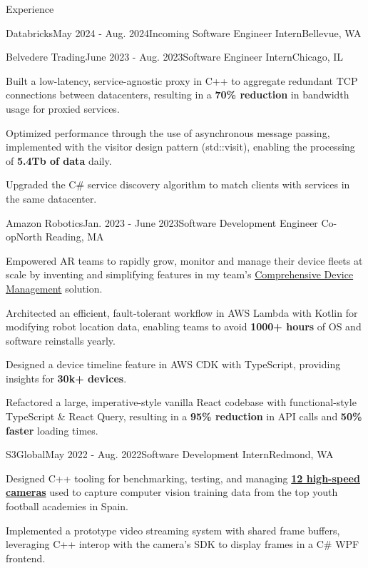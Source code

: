 \documentclass{resume}
\begin{document}
  \begin{rSection}{Experience}

    \begin{rSubsection}{Databricks}{May 2024 - Aug. 2024}{Incoming Software Engineer Intern}{Bellevue, WA}
    \end{rSubsection}

    \begin{rSubsection}{Belvedere Trading}{June 2023 - Aug. 2023}{Software Engineer Intern}{Chicago, IL}
      \item Built a low-latency, service-agnostic proxy in C++ to aggregate redundant TCP
        connections between datacenters, resulting in a \textbf{70\% reduction} in bandwidth usage for proxied services.
      \item Optimized performance through the use of asynchronous message passing, implemented with the visitor
        design pattern (std::visit), enabling the processing of \textbf{5.4Tb of data} daily.      
      \item Upgraded the C\# service discovery algorithm to match clients with services in the same datacenter.
    \end{rSubsection}

    \begin{rSubsection}{Amazon Robotics}{Jan. 2023 - June 2023}{Software Development Engineer Co-op}{North Reading, MA}
      \item Empowered AR teams to rapidly grow, monitor and manage their device fleets at scale by inventing and simplifying
        features in my team's 
        \href{https://www.allthingsdistributed.com/2021/07/amazon-robotics-on-aws.html}{Comprehensive Device Management} solution. 
      \item Architected an efficient, fault-tolerant workflow in AWS Lambda with Kotlin for modifying 
        robot location data, enabling teams to avoid \textbf{1000+ hours} of OS and software reinstalls yearly.
      \item Designed a device timeline feature in AWS CDK with TypeScript, providing insights for \textbf{30k+ devices}. 
      \item Refactored a large, imperative-style vanilla React codebase with functional-style 
        TypeScript \& React Query, resulting in a \textbf{95\% reduction} in API calls and \textbf{50\% faster} loading times.
    \end{rSubsection}

    \begin{rSubsection}{S3Global}{May 2022 - Aug. 2022}{Software Development Intern}{Redmond, WA}
    \item Designed C++ tooling for benchmarking, testing, and managing 
      \textbf{\href{https://emergentvisiontec.com/}{12 high-speed cameras}} used to capture 
        computer vision training data from the top youth football academies in Spain.
      \item Implemented a prototype video streaming system with shared frame buffers, leveraging C++ interop with the camera's SDK
        to display frames in a C\# WPF frontend.
    \end{rSubsection}

  \end{rSection}
\end{document}
